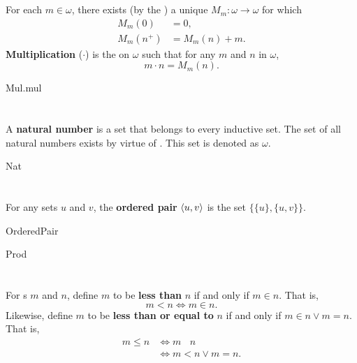 \documentclass{report}
\newcommand{\ineq}{\,\mathop{\underline{\in}}\,}
\begin{document}
\section{}%

  For each $m \in \omega$, there exists (by the
    ) a unique
     $M_m \colon \omega \rightarrow \omega$ for which
    \begin{align*}
      M_m(0) & = 0, \\
      M_m(n^+) & = M_m(n) + m.
    \end{align*}
  \textbf{Multiplication} ($\cdot$) is the  on
    $\omega$ such that for any $m$ and $n$ in $\omega$, $$m \cdot n = M_m(n).$$

    {Mul.mul}

\section{}%

  A \textbf{natural number} is a set that belongs to every inductive set.
  The set of all natural numbers exists by virtue of .
  This set is denoted as $\omega$.

    {Nat}

\section{}%

  For any sets $u$ and $v$, the \textbf{ordered pair} $\left< u, v \right>$ is
    the set $\{\{u\}, \{u, v\}\}$.

    {OrderedPair}

    {Prod}

\section{}%

  For s $m$ and $n$, define $m$ to be
    \textbf{less than} $n$ if and only if $m \in n$.
  That is, $$m < n \iff m \in n.$$
  Likewise, define $m$ to be \textbf{less than or equal to} $n$ if and only if
    $m \in n \lor m = n$.
  That is,
    \begin{align*}
      m \leq n
        & \iff m \ineq n \\
        & \iff m < n \lor m = n.
    \end{align*}
\end{document}
